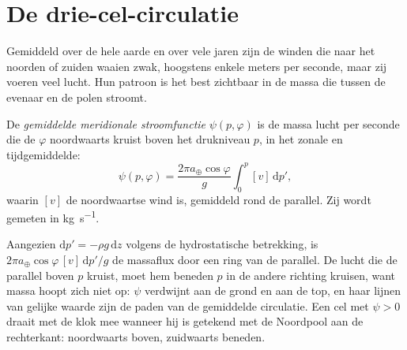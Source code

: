 \section{De drie-cel-circulatie}\label{sec:b1:atmospheric-circulation:cells}

Gemiddeld over de hele aarde en over vele jaren zijn de winden die naar het noorden of zuiden waaien zwak, hoogstens enkele meters per seconde, maar zij voeren veel lucht. Hun patroon is het best zichtbaar in de massa die tussen de evenaar en de polen stroomt.

\begin{definition}\label{def:b1:atmospheric-circulation:streamfunction}
De \emph{gemiddelde meridionale stroomfunctie}
$\psi(p, \varphi)$ is de massa lucht per seconde die de  $\varphi$ noordwaarts kruist boven het drukniveau $p$, in het zonale en tijdgemiddelde:
\[
  \psi(p, \varphi) = \frac{2\pi a_\oplus\cos\varphi}{g}\int_0^p [v]\,\mathrm dp' ,
\]
waarin $[v]$ de noordwaartse wind is, gemiddeld rond de parallel. Zij wordt gemeten in
\unit{kg.s^{-1}}.
\end{definition}

Aangezien $\mathrm dp' = -\rho g\,\mathrm dz$ volgens de hydrostatische betrekking, is $2\pi a_\oplus
\cos\varphi\,[v]\,\mathrm dp'/g$ de massaflux door een ring van de parallel. De lucht die de parallel boven $p$ kruist, moet hem beneden $p$ in de andere richting kruisen, want massa hoopt zich niet op: $\psi$ verdwijnt aan de grond en aan de top, en haar lijnen van gelijke waarde zijn de paden van de gemiddelde circulatie. Een cel met $\psi > 0$ draait met de klok mee wanneer hij is getekend met de Noordpool aan de rechterkant: noordwaarts boven, zuidwaarts beneden.

